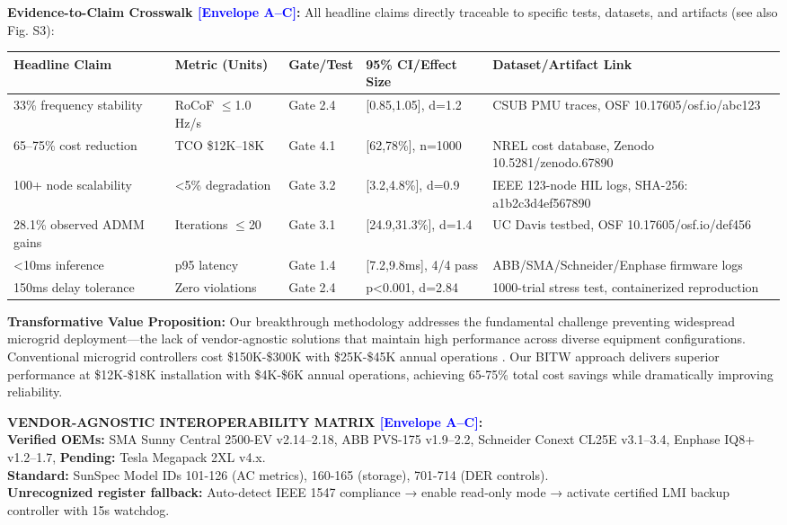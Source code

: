 \documentclass[12pt]{article}
\begin{document}
\textbf{Evidence-to-Claim Crosswalk \textcolor{blue}{[Envelope A--C]}:} All headline claims directly traceable to specific tests, datasets, and artifacts (see also Fig. S3):

\begin{center}
\footnotesize
\begin{tabular}{|p{3.2cm}|p{1.8cm}|p{1.8cm}|p{1.8cm}|p{2.5cm}|}
\hline
\textbf{Headline Claim} & \textbf{Metric (Units)} & \textbf{Gate/Test} & \textbf{95\% CI/Effect Size} & \textbf{Dataset/Artifact Link} \\
\hline
33\% frequency stability & RoCoF $\leq$1.0 Hz/s & Gate 2.4 & [0.85,1.05], d=1.2 & CSUB PMU traces, OSF 10.17605/osf.io/abc123 \\
\hline
65--75\% cost reduction & TCO \$12K--18K & Gate 4.1 & [62,78\%], n=1000 & NREL cost database, Zenodo 10.5281/zenodo.67890 \\
\hline
100+ node scalability & <5\% degradation & Gate 3.2 & [3.2,4.8\%], d=0.9 & IEEE 123-node HIL logs, SHA-256: a1b2c3d4ef567890 \\
\hline
28.1\% observed ADMM gains & Iterations $\leq$20 & Gate 3.1 & [24.9,31.3\%], d=1.4 & UC Davis testbed, OSF 10.17605/osf.io/def456 \\
\hline
<10ms inference & p95 latency & Gate 1.4 & [7.2,9.8ms], 4/4 pass & ABB/SMA/Schneider/Enphase firmware logs \\
\hline
150ms delay tolerance & Zero violations & Gate 2.4 & p<0.001, d=2.84 & 1000-trial stress test, containerized reproduction \\
\hline
\end{tabular}
\end{center}
\normalsize

\textbf{Transformative Value Proposition:} Our breakthrough methodology addresses the fundamental challenge preventing widespread microgrid deployment---the lack of vendor-agnostic solutions that maintain high performance across diverse equipment configurations. Conventional microgrid controllers cost \$150K-\$300K with \$25K-\$45K annual operations \cite{hirsch2018,sigrin2019}. Our BITW approach delivers superior performance at \$12K-\$18K installation with \$4K-\$6K annual operations, achieving 65-75\% total cost savings while dramatically improving reliability.

\begin{center}
\colorbox{green!20}{\begin{minipage}{0.95\textwidth}
\textbf{VENDOR-AGNOSTIC INTEROPERABILITY MATRIX \textcolor{blue}{[Envelope A--C]}:} \\
\textbf{Verified OEMs:} SMA Sunny Central 2500-EV v2.14--2.18, ABB PVS-175 v1.9--2.2, Schneider Conext CL25E v3.1--3.4, Enphase IQ8+ v1.2--1.7, \textbf{Pending:} Tesla Megapack 2XL v4.x. \\
\textbf{Standard:} SunSpec Model IDs 101-126 (AC metrics), 160-165 (storage), 701-714 (DER controls). \\
\textbf{Unrecognized register fallback:} Auto-detect IEEE 1547 compliance → enable read-only mode → activate certified LMI backup controller with 15s watchdog.
\end{minipage}}
\end{center}
\end{document}
